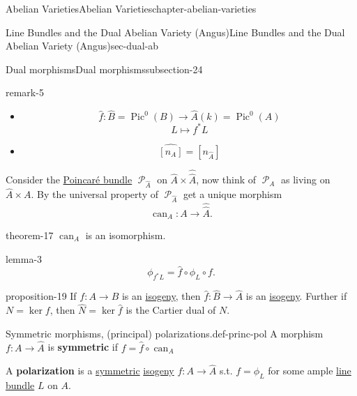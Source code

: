 \documentclass[oneside,10pt,]{book}
\newcommand{\terminology}[1]{\textbf{#1}}
\numberwithin{equation}{section}
\newcommand{\sheaf}[1]{\operatorname{\mathcal{#1}}}
\newcommand{\lb}{[}
\newcommand{\rb}{]}
\DeclareMathOperator{\Pic}{Pic}
\begin{document}
\begin{chapterptx}{Abelian Varieties}{}{Abelian Varieties}{}{}{chapter-abelian-varieties}
\begin{sectionptx}{Line Bundles and the Dual Abelian Variety (Angus)}{}{Line Bundles and the Dual Abelian Variety (Angus)}{}{}{sec-dual-ab}
\begin{subsectionptx}{Dual morphisms}{}{Dual morphisms}{}{}{subsection-24}
\begin{remark}{}{remark-5}%
\hypertarget{p-197}{}%
\leavevmode%
\begin{itemize}[label=\textbullet]
\item{}%
\begin{equation*}
\hat f\colon \hat B = \Pic^0(B) \to \hat A(k) = \Pic^0(A)
\end{equation*}
%
\begin{equation*}
L\mapsto f^*L
\end{equation*}
%
\item{}%
\begin{equation*}
\hat{\lb n_A\rb} = [n_{\hat A}]
\end{equation*}
%
\end{itemize}
%
\end{remark}
\hypertarget{p-198}{}%
Consider the \hyperref[thm-poincare-bundle]{Poincaré bundle} \(\sheaf P_{\hat A}\) on \(\hat A \times \hat{\hat{A}}\), now think of \(\sheaf P_A\) as living on \(\hat A \times A\). By the universal property of \(\sheaf P_{\hat A}\) get a unique morphism%
\begin{equation*}
\operatorname{can}_A\colon A\to\hat{\hat A}\text{.}
\end{equation*}
%
\begin{theorem}{}{}{theorem-17}%
\hypertarget{p-199}{}%
\(\operatorname{can}_A\) is an isomorphism.%
\end{theorem}
\begin{lemma}{}{}{lemma-3}%
\hypertarget{p-200}{}%
%
\begin{equation*}
\phi_{f^*L} = \hat f\circ \phi_L\circ f\text{.}
\end{equation*}
%
\end{lemma}
\begin{proposition}{}{}{proposition-19}%
\hypertarget{p-201}{}%
If \(f\colon A \to B\) is an \hyperref[def-supersing-isog-isog]{isogeny}, then \(\hat f\colon \hat B \to \hat A\) is an \hyperref[def-supersing-isog-isog]{isogeny}. Further if \(N  = \ker f\), then \(\hat N = \ker \hat f\) is the Cartier  dual of \(N\).%
\end{proposition}
\begin{definition}{Symmetric morphisms, (principal) polarizations.}{def-princ-pol}%
\hypertarget{p-202}{}%
A morphism \(f\colon A \to \hat A\) is \terminology{symmetric} if \(f = \hat f\circ \operatorname{can}_A\)%
\par
\hypertarget{p-203}{}%
A \terminology{polarization} is a \hyperref[def-princ-pol]{symmetric} \hyperref[def-supersing-isog-isog]{isogeny} \(f\colon A \to \hat A\) s.t. \(f=  \phi_L\) for some ample \hyperref[def-line-bundle]{line bundle} \(L\) on \(A\).%

\end{definition}
\end{subsectionptx}
\end{sectionptx}
\end{chapterptx}
\end{document}
